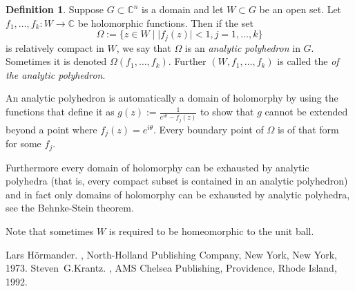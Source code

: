 \documentclass[12pt]{article}
\theoremstyle{theorem}
\theoremstyle{definition}
\newtheorem*{defn}{Definition}
\begin{document}
\begin{defn}
Suppose $G \subset {\mathbb{C}}^n$ is a domain and let $W \subset G$
be an open set.  Let $f_1,\ldots,f_k \colon W \to {\mathbb{C}}$ be holomorphic 
functions.  Then if the set
\begin{equation*}
\Omega := \{ z \in W \mid \lvert f_j (z) \rvert < 1 , j=1,\ldots,k \}
\end{equation*}
is relatively compact in $W$, we say that $\Omega$ is an
{\em analytic polyhedron} in $G$.  Sometimes it is denoted
$\Omega(f_1,\ldots,f_k)$.  Further $(W,f_1,\ldots,f_k)$ is called the
{\em {} of the analytic polyhedron}.
\end{defn}

An analytic polyhedron is automatically a domain of holomorphy by using
the functions that define it as $g(z) := \frac{1}{e^{i\theta}-f_j(z)}$ to
show that $g$ cannot be extended beyond a point where $f_j(z) = e^{i\theta}$.
Every boundary point of $\Omega$ is of that form for some $f_j$.

Furthermore every domain of holomorphy can be exhausted by analytic polyhedra (that is, every compact subset is contained in an analytic polyhedron)
and in fact only domains of holomorphy can be exhausted by analytic
polyhedra, see the Behnke-Stein theorem.

Note that sometimes $W$ is required to be homeomorphic to the unit ball.

\begin{thebibliography}{9}
Lars H\"ormander.
{\em {}},
North-Holland Publishing Company, New York, New York, 1973.
Steven~G.\@ Krantz.
{\em {}},
AMS Chelsea Publishing, Providence, Rhode Island, 1992.
\end{thebibliography}
\end{document}
